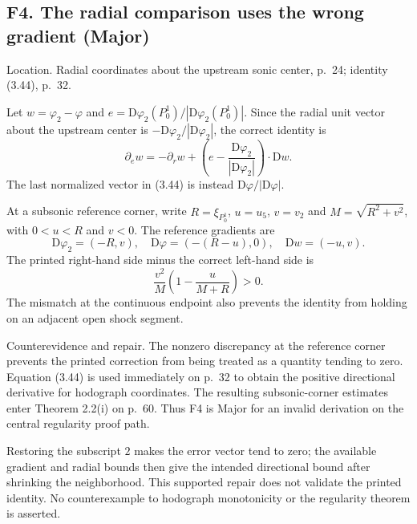 \documentclass[10pt]{article}
\begin{document}
\subsection*{F4. The radial comparison uses the wrong gradient (Major)}
Location. Radial coordinates about the upstream sonic center, p. 24; identity (3.44), p. 32.\par
Let \(w=\varphi_2-\varphi\) and \(e=\mathrm D\varphi_2(P_0^1)/|\mathrm D\varphi_2(P_0^1)|\). Since the radial unit vector about the upstream center is \(-\mathrm D\varphi_2/|\mathrm D\varphi_2|\), the correct identity is \[\partial_e w=-\partial_r w+
 \left(e-\frac{\mathrm D\varphi_2}{|\mathrm D\varphi_2|}\right)\cdot\mathrm Dw.\] The last normalized vector in (3.44) is instead \(\mathrm D\varphi/|\mathrm D\varphi|\).\par
At a subsonic reference corner, write \(R=\xi_{P_0^1}\), \(u=u_5\), \(v=v_2\) and \(M=\sqrt{R^2+v^2}\), with \(0<u<R\) and \(v<0\). The reference gradients are \[\mathrm D\varphi_2=(-R,v),\quad \mathrm D\varphi=(-(R-u),0),\quad
 \mathrm Dw=(-u,v).\] The printed right-hand side minus the correct left-hand side is \[\frac{v^2}{M}\left(1-\frac{u}{M+R}\right)>0.\] The mismatch at the continuous endpoint also prevents the identity from holding on an adjacent open shock segment.\par
Counterevidence and repair. The nonzero discrepancy at the reference corner prevents the printed correction from being treated as a quantity tending to zero. Equation (3.44) is used immediately on p. 32 to obtain the positive directional derivative for hodograph coordinates. The resulting subsonic-corner estimates enter Theorem 2.2(i) on p. 60. Thus F4 is Major for an invalid derivation on the central regularity proof path.\par
Restoring the subscript \(2\) makes the error vector tend to zero; the available gradient and radial bounds then give the intended directional bound after shrinking the neighborhood. This supported repair does not validate the printed identity. No counterexample to hodograph monotonicity or the regularity theorem is asserted.\par
\end{document}
